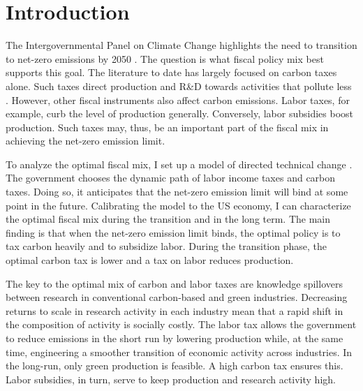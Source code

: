 \clearpage
\section{Introduction}




The Intergovernmental Panel on Climate Change highlights the need to transition to net-zero emissions by 2050 \citep{IPCC2022}. The question is what fiscal policy mix best supports this goal. The literature to date has largely focused on carbon taxes alone. Such taxes direct production and R\&D towards activities that pollute less \citep{Acemoglu2012TheChange}. However, other fiscal instruments also affect carbon emissions. Labor taxes, for example, curb the level of production generally. Conversely, labor subsidies  boost production. Such taxes may, thus, be an important part of the fiscal mix in achieving the  net-zero emission limit.

To analyze the optimal fiscal mix, I set up a model of directed technical change \citep{Acemoglu2002DirectedChange, Acemoglu2012TheChange}. The government chooses the dynamic path of labor income taxes and carbon taxes. Doing so, it anticipates that the net-zero emission limit will bind at some point in the future. Calibrating the model to the US economy, I can characterize the optimal fiscal mix during the transition and in the long term. The main finding is that when the net-zero emission limit binds, the optimal policy is to tax carbon heavily and to subsidize labor. During the transition phase, the optimal carbon tax is lower and a tax on labor reduces production. 

The key to the optimal mix of carbon and labor taxes are knowledge spillovers between research in conventional carbon-based and green industries. Decreasing returns to scale in research activity in each industry mean that a rapid shift in the composition of activity is socially costly. The labor tax allows the government to reduce emissions in the short run by  lowering production while, at the same time, engineering a smoother transition of economic activity across industries. In the long-run, only green production is feasible. A high carbon tax ensures this. Labor subsidies, in turn, serve to keep production and research activity high.


